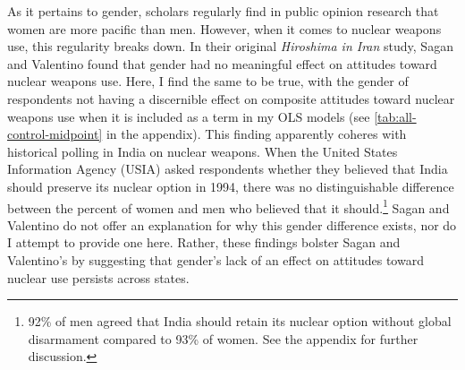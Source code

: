 \documentclass[12pt]{article}
\begin{document}
As it pertains to gender, scholars regularly find in public opinion research that women are more pacific than men. However, when it comes to nuclear weapons use, this regularity breaks down. In their original \textit{Hiroshima in Iran} study, Sagan and Valentino found that gender had no meaningful effect on attitudes toward nuclear weapons use. Here, I find the same to be true, with the gender of respondents not having a discernible effect on composite attitudes toward nuclear weapons use when it is included as a term in my OLS models (see \autoref{tab:all-control-midpoint} in the appendix). This finding apparently coheres with historical polling in India on nuclear weapons. When the United States Information Agency (USIA) asked respondents whether they believed that India should preserve its nuclear option in 1994, there was no distinguishable difference between the percent of women and men who believed that it should.\footnote{92\% of men agreed that India should retain its nuclear option without global disarmament compared to 93\% of women. See the appendix for further discussion.} Sagan and Valentino do not offer an explanation for why this gender difference exists, nor do I attempt to provide one here. Rather, these findings bolster Sagan and Valentino's by suggesting that gender's lack of an effect on attitudes toward nuclear use persists across states.
\end{document}
